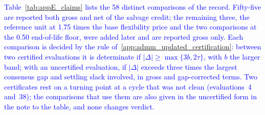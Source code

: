 \documentclass[preprint,12pt]{elsarticle}
\begin{document}
\textcolor{blue}{
    Table~\ref{tab:appE_claims} lists the 58 distinct comparisons of the record. Fifty-five are reported both gross and net of the salvage credit; the remaining three, the reference unit at 1.75 times the base flexibility price and the two comparisons at the 0.50 end-of-life floor, were added later and are reported gross only. Each comparison is decided by the rule of~\ref{app:admm_updated_certification}: between two certified evaluations it is determinate if $|\Delta| \geq \max\{3b, 2\tau\}$, with $b$ the larger band; with an uncertified evaluation, if $|\Delta|$ exceeds three times the largest consensus gap and settling slack involved, in gross and gap-corrected terms. Two certificates rest on a turning point at a cycle that was not clean (evaluations~4 and~38); the comparisons that use them are also given in the uncertified form in the note to the table, and none changes verdict.
}
\end{document}
